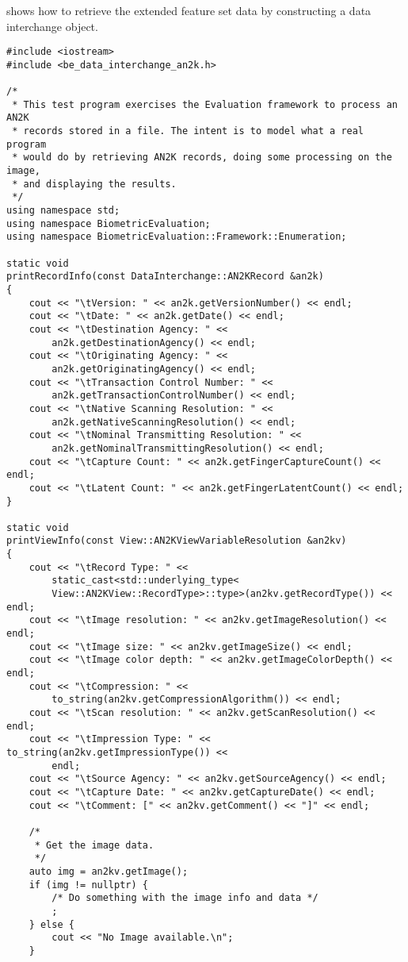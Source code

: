  shows how to retrieve the extended feature set data by
constructing a data interchange object.

\begin{lstlisting}[caption={ANSI/NIST Data Interchange}, label=lst:an2kdiuse]
#include <iostream>
#include <be_data_interchange_an2k.h>

/*
 * This test program exercises the Evaluation framework to process an AN2K
 * records stored in a file. The intent is to model what a real program
 * would do by retrieving AN2K records, doing some processing on the image,
 * and displaying the results.
 */
using namespace std;
using namespace BiometricEvaluation;
using namespace BiometricEvaluation::Framework::Enumeration;

static void
printRecordInfo(const DataInterchange::AN2KRecord &an2k)
{
	cout << "\tVersion: " << an2k.getVersionNumber() << endl;
	cout << "\tDate: " << an2k.getDate() << endl;
	cout << "\tDestination Agency: " <<
	    an2k.getDestinationAgency() << endl;
	cout << "\tOriginating Agency: " <<
	    an2k.getOriginatingAgency() << endl;
	cout << "\tTransaction Control Number: " <<
	    an2k.getTransactionControlNumber() << endl;
	cout << "\tNative Scanning Resolution: " <<
	    an2k.getNativeScanningResolution() << endl;
	cout << "\tNominal Transmitting Resolution: " <<
	    an2k.getNominalTransmittingResolution() << endl;
	cout << "\tCapture Count: " << an2k.getFingerCaptureCount() << endl;
	cout << "\tLatent Count: " << an2k.getFingerLatentCount() << endl;
}

static void
printViewInfo(const View::AN2KViewVariableResolution &an2kv)
{
	cout << "\tRecord Type: " <<
	    static_cast<std::underlying_type<
	    View::AN2KView::RecordType>::type>(an2kv.getRecordType()) << endl;
	cout << "\tImage resolution: " << an2kv.getImageResolution() << endl;
	cout << "\tImage size: " << an2kv.getImageSize() << endl;
	cout << "\tImage color depth: " << an2kv.getImageColorDepth() << endl;
	cout << "\tCompression: " <<
	    to_string(an2kv.getCompressionAlgorithm()) << endl;
	cout << "\tScan resolution: " << an2kv.getScanResolution() << endl;
	cout << "\tImpression Type: " << to_string(an2kv.getImpressionType()) <<
	    endl;
	cout << "\tSource Agency: " << an2kv.getSourceAgency() << endl;
	cout << "\tCapture Date: " << an2kv.getCaptureDate() << endl;
	cout << "\tComment: [" << an2kv.getComment() << "]" << endl;

	/*
	 * Get the image data.
	 */
	auto img = an2kv.getImage();
	if (img != nullptr) {
		/* Do something with the image info and data */
		;
	} else {
		cout << "No Image available.\n";
	}


\end{lstlisting}
